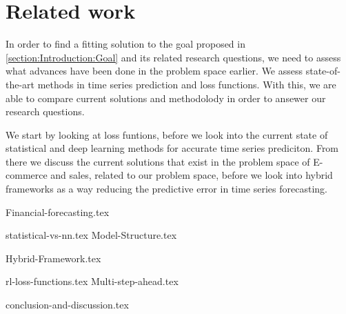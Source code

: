 \chapter{Related work}
\label{section:RelatedWork}

\iffalse
Our problem can be composed into two main categories.
time series forecasting, and e-commerce trend forecasting.
What is the characteristics of e-commerce trend forecasting?
The domain consists of multiple time series, some which correlate.
The time series contains multiple periods, for example users shop
online ofter on sundays than on mondays. 
Some categories are popular in the spring, others in the fall.
Mabye online shopping spikes around common paydays?
\fi


In order to find a fitting solution to the goal proposed in \ref{section:Introduction:Goal} and its related research questions,
we need to assess what advances have been done in the problem space earlier.
We assess state-of-the-art methods in time series prediction and loss functions.
With this, we are able to compare current solutions and methodolody in order to ansewer our research questions.

We start by looking at loss funtions, before we look into the current state of statistical and deep learning methods for accurate time series prediciton.
From there we discuss the current solutions that exist in the problem space of E-commerce and sales, related to our problem space,
before we look into hybrid frameworks as a way reducing the predictive error in time series forecasting.



{Financial-forecasting.tex}

{statistical-vs-nn.tex}
{Model-Structure.tex}

{Hybrid-Framework.tex}

{rl-loss-functions.tex}
{Multi-step-ahead.tex}

{conclusion-and-discussion.tex}